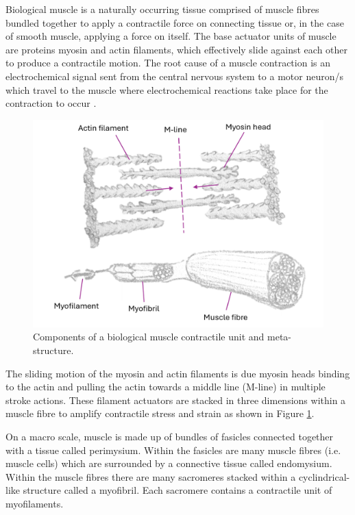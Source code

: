 Biological muscle is a naturally occurring tissue comprised of muscle fibres bundled together to apply a contractile force on connecting tissue or, in the case of smooth muscle, applying a force on itself. The base actuator units of muscle are proteins myosin and actin filaments, which effectively slide against each other to produce a contractile motion. The root cause of a muscle contraction is an electrochemical signal sent from the central nervous system to a motor neuron/s which travel to the muscle where electrochemical reactions take place for the contraction to occur \cite{Keynes2011}.
\begin{figure}[H]
	\centering
	\includegraphics[width=0.6\linewidth]{Figures/motor-unit-myo-fibril-to-fibre.png}
	\caption{Components of a biological muscle contractile unit and meta-structure.}
	\label{fig:muscle_units}
\end{figure}
The sliding motion of the myosin and actin filaments is due myosin heads binding to the actin and pulling the actin towards a middle line (M-line) in multiple stroke actions. These filament actuators are stacked in three dimensions within a muscle fibre to amplify contractile stress and strain as shown in Figure \ref{fig:muscle_units}.

On a macro scale, muscle is made up of bundles of fasicles connected together with a tissue called perimysium. Within the fasicles are many muscle fibres (i.e. muscle cells) which are surrounded by a connective tissue called endomysium. Within the muscle fibres there are many sacromeres stacked within a cyclindrical-like structure called a myofibril. Each sacromere contains a contractile unit of myofilaments. 



